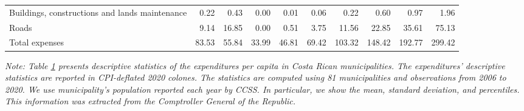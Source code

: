 \begin{table}[h]
\begin{center}
{\begin{tabular}{lrrrrrrrrr}
Buildings, constructions and lands maintenance & 0.22 & 0.43 & 0.00 & 0.01 & 0.06 & 0.22 & 0.60 & 0.97 & 1.96 \\
Roads & 9.14 & 16.85 & 0.00 & 0.51 & 3.75 & 11.56 & 22.85 & 35.61 & 75.13 \\
\hline
Total expenses & 83.53 & 55.84 & 33.99 & 46.81 & 69.42 & 103.32 & 148.42 & 192.77 & 299.42 \\
\hline
\hline
\end{tabular}}
\label{table:summ}
\end{center}
\footnotesize
\textit{Note: Table \ref{table:summ} presents descriptive statistics of the expenditures per capita in Costa Rican municipalities. The expenditures' descriptive statistics are reported in CPI-deflated 2020 colones. The statistics are computed using 81 municipalities and observations from 2006 to 2020. We use municipality's population reported each year by CCSS. In particular, we show the mean, standard deviation, and percentiles. This information was extracted from the Comptroller General of the Republic.}
\end{table}

